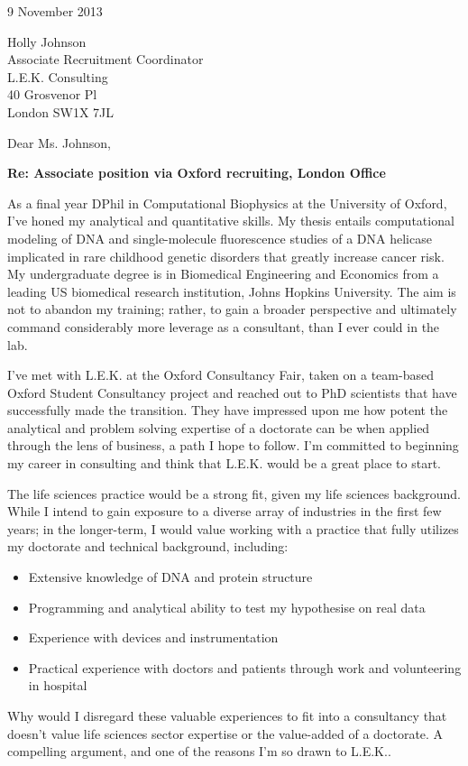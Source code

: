 \documentclass[a4paper]{../res}
\begin{document}
 
\begin{sloppypar}
 
%


\begin{resume} 

9 November 2013

Holly Johnson \\
Associate Recruitment Coordinator \\
L.E.K. Consulting \\
40 Grosvenor Pl \\
London SW1X 7JL

Dear Ms. Johnson,

\textbf{Re: Associate position via Oxford recruiting, London Office}

As a final year DPhil in Computational Biophysics at the University of Oxford, I've honed my analytical and quantitative skills. My thesis entails computational modeling of DNA and single-molecule fluorescence studies of a DNA helicase implicated in rare childhood genetic disorders that greatly increase cancer risk. My undergraduate degree is in Biomedical Engineering and Economics from a leading US biomedical research institution, Johns Hopkins University. The aim is not to abandon my training; rather, to gain a broader perspective and ultimately command considerably more leverage as a consultant, than I ever could in the lab.

I've met with L.E.K. at the Oxford Consultancy Fair, taken on a team-based Oxford Student Consultancy project and reached out to PhD scientists that have successfully made the transition. They have impressed upon me how potent the analytical and problem solving expertise of a doctorate can be when applied through the lens of business, a path I hope to follow. I'm committed to beginning my career in consulting and think that L.E.K. would be a great place to start.

The life sciences practice would be a strong fit, given my life sciences background. While I intend to gain exposure to a diverse array of industries in the first few years; in the longer-term, I would value working with a practice that fully utilizes my doctorate and technical background, including:
\begin{itemize}[itemindent=1cm]
    \item Extensive knowledge of DNA and protein structure
    \item Programming and analytical ability to test my hypothesise on real data
    \item Experience with devices and instrumentation
    \item Practical experience with doctors and patients through work and volunteering in hospital 
\end{itemize}
Why would I disregard these valuable experiences to fit into a consultancy that doesn't value life sciences sector expertise or the value-added of a doctorate. A compelling argument, and one of the reasons I'm so drawn to L.E.K..


\end{resume}
\end{sloppypar}
\end{document}
